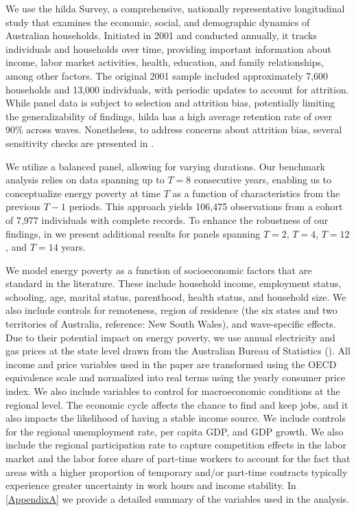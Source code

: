 \documentclass[preprint,authoryear,12pt]{elsarticle}
\newcommand{\citeTwo}[1]{(\cite{#1})}
\begin{document}
We use the \Gls{hilda} Survey, a comprehensive, nationally representative longitudinal study that examines the economic, social, and demographic dynamics of Australian households. Initiated in 2001 and conducted annually, it tracks individuals and households over time, providing important information about income, labor market activities, health, education, and family relationships, among other factors. The original 2001 sample included approximately 7,600 households and 13,000 individuals, with periodic updates to account for attrition. While panel data is subject to selection and attrition bias, potentially limiting the generalizability of findings, \Gls{hilda} has a high average retention rate of over 90\% across waves. Nonetheless, to address concerns about attrition bias, several sensitivity checks are presented in .

We utilize a balanced panel, allowing for varying durations. Our benchmark analysis relies on data spanning up to $T=8$ consecutive years, enabling us to conceptualize energy poverty at time $T$ as a function of characteristics from the previous $T-1$ periods. This approach yields 106,475 observations from a cohort of 7,977 individuals with complete records. To enhance the robustness of our findings, in  we present additional results for panels spanning $T=2$, $T=4$, $T=12$, and $T=14$ years. 

We model energy poverty as a function of socioeconomic factors that are standard in the literature. These include household income, employment status, schooling, age, marital status, parenthood, health status, and household size. We also include controls for remoteness, region of residence (the six states and two territories of Australia, reference: New South Wales), and wave-specific effects. Due to their potential impact on energy poverty, we use annual electricity and gas prices at the state level drawn from the Australian Bureau of Statistics \citeTwo{ABS24}. All income and price variables used in the paper are transformed using the OECD equivalence scale and normalized into real terms using the yearly consumer price index. We also include variables to control for macroeconomic conditions at the regional level. The economic cycle affects the chance to find and keep jobs, and it also impacts the likelihood of having a stable income source. We include controls for the regional unemployment rate, per capita GDP, and GDP growth. We also include the regional participation rate to capture competition effects in the labor market and the labor force share of part-time workers to account for the fact that areas with a higher proportion of temporary and/or part-time contracts typically experience greater uncertainty in work hours and income stability. In  \ref{AppendixA} we provide a detailed summary of the variables used in the analysis.
\end{document}
